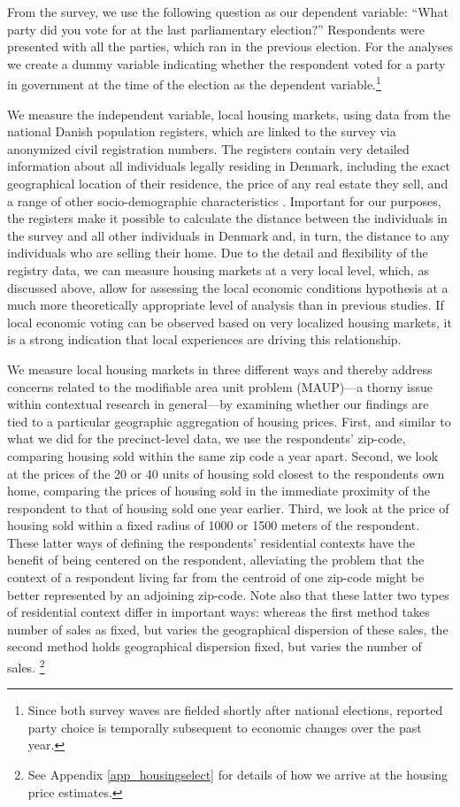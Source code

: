 \documentclass[12pt,a4paper]{article}
\begin{document}
	From the survey, we use the following question as our dependent variable: ``What party did you vote for at the last parliamentary election?'' Respondents were presented with all the parties, which ran in the previous election. For the analyses we create a dummy variable indicating whether the respondent voted for a party in government at the time of the election as the dependent variable.\footnote{Since both survey waves are fielded shortly after national elections, reported party choice is temporally subsequent to economic changes over the past year.}
	
	We measure the independent variable, local housing markets, using data from the national Danish population registers, which are linked to the survey via anonymized civil registration numbers. The registers contain very detailed information about all individuals legally residing in Denmark, including the exact geographical location of their residence, the price of any real estate they sell, and a range of other socio-demographic characteristics \citep{thygesen2011introduction}. Important for our purposes, the registers make it possible to calculate the distance between the individuals in the survey and all other individuals in Denmark and, in turn, the distance to any individuals who are selling their home. Due to the detail and flexibility of the registry data, we can measure housing markets at a very local level, which, as discussed above,  allow for assessing the local economic conditions hypothesis at a much more theoretically appropriate level of analysis than in previous studies. If local economic voting can be observed based on very localized housing markets, it is a strong indication that local experiences are driving this relationship. 
	
	We measure local housing markets in three different ways and thereby address concerns related to the modifiable area unit problem (MAUP)—a thorny issue within contextual research in general—by examining whether our findings are tied to a particular geographic aggregation of housing prices. First, and similar to what we did for the precinct-level data, we use the respondents’ zip-code, comparing housing sold within the same zip code a year apart. Second, we look at the prices of the 20 or 40 units of housing sold closest to the respondents own home, comparing the prices of housing sold in the immediate proximity of the respondent to that of housing sold one year earlier. Third, we look at the price of housing sold within a fixed radius of 1000 or 1500 meters of the respondent. These latter ways of defining the respondents’ residential contexts have the benefit of being centered on the respondent, alleviating the problem that the context of a respondent living far from the centroid of one zip-code might be better represented by an adjoining zip-code. Note also that these latter two types of residential context differ in important ways: whereas the first method takes number of sales as fixed, but varies the geographical dispersion of these sales, the second method holds geographical dispersion fixed, but varies the number of sales. \footnote{See Appendix \ref{app_housingselect} for details of how we arrive at the housing price estimates.}
	
\end{document}
